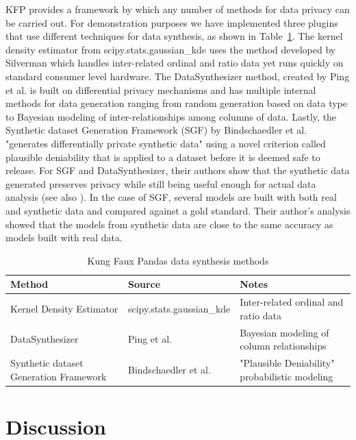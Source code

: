 \documentclass{article}
\begin{document}
KFP provides a framework by which any number of methods for data privacy can be carried out. For demonstration purposes we have implemented three plugins that use different techniques for data synthesis, as shown in Table~\ref{included-methods}. The kernel density estimator from scipy.stats.gaussian\_kde uses the method developed by Silverman \cite{silverman_density_1986} which handles inter-related ordinal and ratio data yet runs quickly on standard consumer level hardware. The DataSynthesizer method, created by Ping et al. \cite{ping17datasynthesizer} is built on differential privacy mechanisms and has multiple internal methods for data generation ranging from random generation based on data type to Bayesian modeling of inter-relationships among columns of data. Lastly, the Synthetic dataset Generation Framework (SGF) by Bindschaedler et al. \cite{Bindschaedler2017} "generates differentially private synthetic data" using a novel criterion called plausible deniability that is applied to a dataset before it is deemed safe to release. For SGF and DataSynthesizer, their authors show that the synthetic data generated preserves privacy while still being useful enough for actual data analysis (see also \cite{howe_synthetic_2017}). In the case of SGF, several models are built with both real and synthetic data and compared against a gold standard. Their author's analysis showed that the models from synthetic data are close to the same accuracy as models built with real data.

\begin{table}
  \caption{Kung Faux Pandas data synthesis methods}
  \label{included-methods}
  \centering
  \begin{tabular}{p{12em} l p{14em}}
    \toprule
    Method                                 & Source                    & Notes \\
    \midrule
    Kernel Density Estimator               & scipy.stats.gaussian\_kde & Inter-related ordinal and ratio data\\
    DataSynthesizer                        & Ping et al.               & Bayesian modeling of column relationships\\
    Synthetic dataset Generation Framework & Bindschaedler et al.      & "Plausible Deniability" probabilistic modeling\\
    \bottomrule
  \end{tabular}
\end{table}

\section{Discussion}
\end{document}

